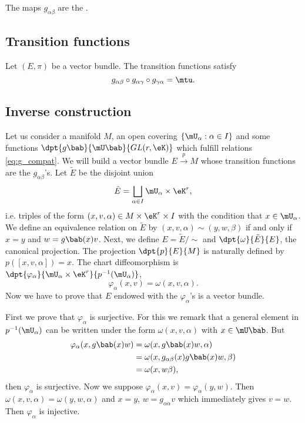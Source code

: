 \begin{definition}
	The maps \( g_{\alpha\beta}\) are the .
\end{definition}

\subsection{Transition functions}

\begin{proposition}
	Let \( (E,\pi)\) be a vector bundle. The transition functions satisfy
	\begin{equation}\label{eq:g_compat}
		g_{\alpha\beta}\circ g_{\alpha\gamma}\circ g_{\gamma\alpha}=\mtu.
	\end{equation}
\end{proposition}

\subsection{Inverse construction}\label{subsec:inv_g}

Let us consider a manifold $M$, an open covering $\{\mU_{\alpha}:\alpha\in I\}$ and some functions $\dpt{g\bab}{\mU\bab}{GL(r,\eK)}$ which fulfill relations \eqref{eq:g_compat}. We will build a vector bundle $E\stackrel{p}{\longrightarrow}M$ whose transition functions are the $g_{\alpha\beta}$'s. Let $\tilde{E}$ be the disjoint union
\[
	\tilde{E}=\bigsqcup_{\alpha\in I}\mU_{\alpha}\times\eK^r,
\]
i.e. triples of the form $(x,v,\alpha)\in M\times\eK^r\times I$ with the condition that $x\in\mU_{\alpha}$. We define an equivalence relation on $\tilde{E}$ by $(x,v,\alpha)\sim(y,w,\beta)$ if and only if $x=y$ and $w=g\bab(x)v$. Next, we define $E=\tilde{E}/\sim$ and $\dpt{\omega}{\tilde{E}}{E}$, the canonical projection. The projection $\dpt{p}{E}{M}$ is naturally defined by $p([x,v,\alpha])=x$. The chart diffeomorphism is $\dpt{\varphi_{\alpha}}{\mU_{\alpha}\times\eK^r}{p^{-1}(\mU_{\alpha})}$,
\[
	\varphi_{\alpha}(x,v)=\omega(x,v,\alpha).
\]
Now we have to prove that $E$ endowed with the $\varphi_{\alpha}$'s is a vector bundle.

First we prove that $\varphi_{\alpha}$ is surjective. For this we remark that a general element in $p^{-1}(\mU_{\alpha})$ can be written under the form $\omega(x,v,\alpha)$ with $x\in\mU\bab$. But
\begin{equation}
	\begin{split}
		\varphi_{\alpha}(x,g\bab(x)w)&=\omega(x,g\bab(x)w,\alpha)\\
		&=\omega(x,g_{\alpha\beta}(x)g\bab(x)w,\beta)\\
		&=\omega(x,w\beta),
	\end{split}
\end{equation}
then $\varphi_{\alpha}$ is surjective. Now we suppose $\varphi_{\alpha}(x,v)=\varphi_{\alpha}(y,w)$. Then $\omega(x,v,\alpha)=\omega(y,w,\alpha)$ and $x=y$, $w=g_{\alpha\alpha}v$ which immediately gives $v=w$. Then $\varphi_{\alpha}$ is injective.

